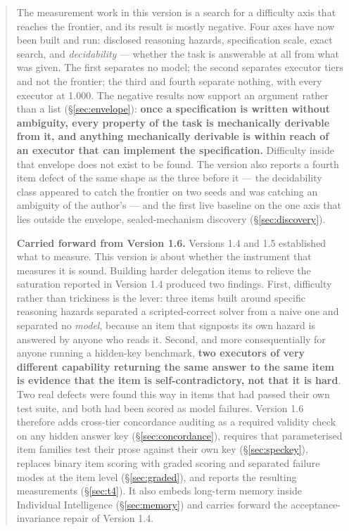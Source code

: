 \documentclass[11pt]{article}
\theoremstyle{definition}
\begin{document}
\begin{abstract}
The measurement work in this version is a search for a difficulty axis that reaches the frontier, and its result is mostly negative. Four axes have now been built and run: disclosed reasoning hazards, specification scale, exact search, and \emph{decidability} --- whether the task is answerable at all from what was given. The first separates no model; the second separates executor tiers and not the frontier; the third and fourth separate nothing, with every executor at 1.000. The negative results now support an argument rather than a list (\S\ref{sec:envelope}): \textbf{once a specification is written without ambiguity, every property of the task is mechanically derivable from it, and anything mechanically derivable is within reach of an executor that can implement the specification.} Difficulty inside that envelope does not exist to be found. The version also reports a fourth item defect of the same shape as the three before it --- the decidability class appeared to catch the frontier on two seeds and was catching an ambiguity of the author's --- and the first live baseline on the one axis that lies outside the envelope, sealed-mechanism discovery (\S\ref{sec:discovery}).

\medskip
\noindent\textbf{Carried forward from Version 1.6.} Versions 1.4 and 1.5 established what to measure. This version is about whether the instrument that measures it is sound. Building harder delegation items to relieve the saturation reported in Version 1.4 produced two findings. First, difficulty rather than trickiness is the lever: three items built around specific reasoning hazards separated a scripted-correct solver from a naive one and separated no \emph{model}, because an item that signposts its own hazard is answered by anyone who reads it. Second, and more consequentially for anyone running a hidden-key benchmark, \textbf{two executors of very different capability returning the same answer to the same item is evidence that the item is self-contradictory, not that it is hard}. Two real defects were found this way in items that had passed their own test suite, and both had been scored as model failures. Version 1.6 therefore adds cross-tier concordance auditing as a required validity check on any hidden answer key (\S\ref{sec:concordance}), requires that parameterised item families test their prose against their own key (\S\ref{sec:speckey}), replaces binary item scoring with graded scoring and separated failure modes at the item level (\S\ref{sec:graded}), and reports the resulting measurements (\S\ref{sec:t4}). It also embeds long-term memory inside Individual Intelligence (\S\ref{sec:memory}) and carries forward the acceptance-invariance repair of Version 1.4.


\end{abstract}
\end{document}
